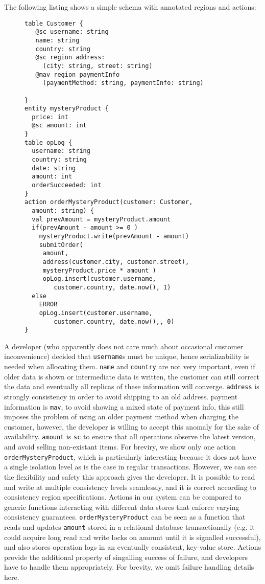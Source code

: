\documentclass[preprint, numbers]{sigplanconf}
\begin{document}
The following listing shows a simple schema with annotated regions and actions:
\begin{figure}[t!] 
\begin{lstlisting}[basicstyle=\small]
table Customer {
   @sc username: string
   name: string 
   country: string
   @sc region address: 
     (city: string, street: string)
   @mav region paymentInfo 
     (paymentMethod: string, paymentInfo: string)

}
entity mysteryProduct {
  price: int
  @sc amount: int
}
table opLog {
  username: string
  country: string
  date: string
  amount: int
  orderSucceeded: int
}
action orderMysteryProduct(customer: Customer,
  amount: string) {
  val prevAmount = mysteryProduct.amount
  if(prevAmount - amount >= 0 )
    mysteryProduct.write(prevAmount - amount)
    submitOrder(
     amount, 
     address(customer.city, customer.street), 
     mysteryProduct.price * amount )
     opLog.insert(customer.username, 
        customer.country, date.now(), 1)
  else 
    ERROR
    opLog.insert(customer.username, 
        customer.country, date.now(),, 0)
}
\end{lstlisting}
\end{figure}

A developer (who apparently does not care much about occasional customer inconvenience)
decided that \texttt{username}s must be unique, hence serializability is needed
when allocating them. \texttt{name} and \texttt{country} are not very important, even if older
data is shown or intermediate data is written, the customer can still correct
the data and eventually all replicas of these information will converge.
\texttt{address} is strongly consistency in order to avoid shipping to an old address.
payment information is \texttt{mav}, to avoid showing a mixed state of payment info, this still
imposes the problem of using an older payment method when charging the customer,
however, the developer is willing to accept this anomaly for the sake of
availability. \texttt{amount} is \texttt{sc} to ensure that all operations
observe the latest version, and avoid selling non-existant items. For breviry,
we show only one action \texttt{orderMysteryProduct}, which is particularly interesting because it does
not have a single isolation level as is the case in regular transactions.
However, we can see the flexibility and safety this approach gives the
developer. It is possible to read and write at multiple consistency levels
seamlessly, and it is correct according to consistency region specifications.
Actions in our system can be compared to generic functions interacting
with different data stores that enforce varying consistency guarantees.
\texttt{orderMysteryProduct}  can be seen as a function that
reads and updates \texttt{amount} stored in a relational database
transactionally (e.g. it could acquire long read and write locks on amount until it is
signalled successful), and also stores operation logs in an eventually consistent,
key-value store. Actions provide the additional property of singalling success
of failure, and developers have to handle them appropriately. For brevity, we omit failure handling details here.
\end{document}
